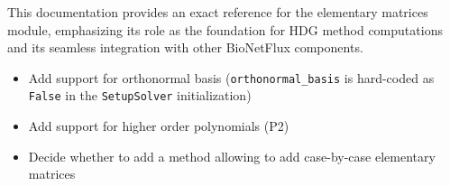 This documentation provides an exact reference for the elementary matrices module, emphasizing its role as the foundation for HDG method computations and its seamless integration with other BioNetFlux components.

\begin{todobox}
	\begin{itemize}
		\item Add support for orthonormal basis ({\tt orthonormal\_basis} is hard-coded as {\tt False} in the {\tt SetupSolver} initialization)
		\item Add support for higher order polynomials (P2)
		\item Decide whether to add a method allowing to add case-by-case elementary matrices
	\end{itemize}
\end{todobox}


